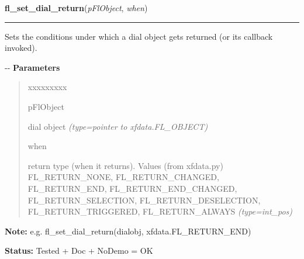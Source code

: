\hspace{.8\funcindent}\begin{boxedminipage}{\funcwidth}

    \raggedright \textbf{fl\_set\_dial\_return}(\textit{pFlObject}, \textit{when})

    \vspace{-1.5ex}

    \rule{\textwidth}{0.5\fboxrule}
\setlength{\parskip}{2ex}

Sets the conditions under which a dial object gets returned (or
its callback invoked).

-{}-
\setlength{\parskip}{1ex}
      \textbf{Parameters}
      \vspace{-1ex}

      \begin{quote}
        \begin{Ventry}{xxxxxxxxx}

          \item[pFlObject]


dial object
            {\it (type=pointer to xfdata.FL\_OBJECT)}

          \item[when]


return type (when it returns). Values (from xfdata.py) FL\_RETURN\_NONE,
FL\_RETURN\_CHANGED, FL\_RETURN\_END, FL\_RETURN\_END\_CHANGED,
FL\_RETURN\_SELECTION, FL\_RETURN\_DESELECTION, FL\_RETURN\_TRIGGERED,
FL\_RETURN\_ALWAYS
            {\it (type=int\_pos)}

        \end{Ventry}

      \end{quote}

\textbf{Note:} 
e.g. fl\_set\_dial\_return(dialobj, xfdata.FL\_RETURN\_END)


\textbf{Status:} 
Tested + Doc + NoDemo = OK


    \end{boxedminipage}

    \label{xformslib:fldial:fl_set_dial_angles}

    \vspace{0.5ex}

